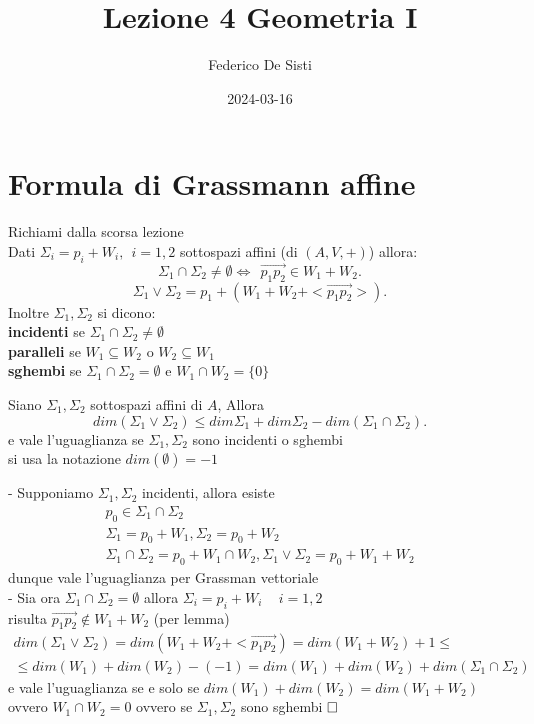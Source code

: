 \documentclass[12px]{article}
\title{Lezione 4 Geometria I}
\date{ 2024-03-16}
\author{Federico De Sisti}
\begin{document}
\newpage
\section{Formula di Grassmann affine}
Richiami dalla scorsa lezione\\
Dati $\Sigma_i = p_i + W_i, \ \ i=1,2$ sottospazi affini (di $(A,V,+)$) allora: \\
\[\Sigma_1\cap\Sigma_2\neq\emptyset \Leftrightarrow \ \ \overrightarrow{p_1p_2}\in W_1 + W_2.\]
\[
	\Sigma_1\vee\Sigma_2 = p_1 + (W_1 + W_2 + <\overrightarrow{p_1p_2}>)
.\] 
Inoltre $\Sigma_1, \Sigma_2$ si dicono:\\
\textbf{incidenti} se $\Sigma_1\cap\Sigma_2\neq\emptyset$\\
\textbf{paralleli} se $W_1\subseteq W_2$ o $W_2\subseteq W_1$ \\
\textbf{sghembi} se $\Sigma_1\cap\Sigma_2 = \emptyset$ e $W_1\cap W_2 = \{0\}$
\begin{prop}
	Siano $\Sigma_1, \Sigma_2 $ sottospazi affini di $A$, Allora 
	\[
	dim(\Sigma_1 \vee \Sigma_2) \leq dim\Sigma_1 + dim\Sigma_2 - dim(\Sigma_1\cap\Sigma_2)
	.\] 
	e vale l'uguaglianza se $\Sigma_1, \Sigma_2$ sono incidenti o sghembi\\
	si usa la notazione $dim(\emptyset) = -1$
\end{prop}
\begin{dimo}
	- Supponiamo $\Sigma_1,\Sigma_2$ incidenti, allora esiste
\begin{gather*}
	p_0 \in\Sigma_1\cap\Sigma_2 \\
	\Sigma_1 = p_0 + W_1, \Sigma_2 = p_0 + W_2\\
	\Sigma_1\cap\Sigma_2 = p_0 + W_1\cap W_2, \Sigma_1\vee\Sigma_2 = p_0 + W_1 + W_2
\end{gather*}
	dunque vale l'uguaglianza per Grassman vettoriale\\
	- Sia ora $\Sigma_1\cap\Sigma_2 = \emptyset$ allora $\Sigma_i = p_i + W_i$ ~ $i = 1, 2$\\
	risulta $\overrightarrow{p_1p_2}\notin W_1 + W_2$ (per lemma)\\
	\begin{gather*}
		dim(\Sigma_1\vee\Sigma_2) = dim(W_1 + W_2 + <\overrightarrow{p_1p_2}) = dim(W_1+W_2) + 1\leq \\ \leq dim(W_1) + dim(W_2) - (-1) = dim(W_1) + dim(W_2) + dim(\Sigma_1\cap\Sigma_2)
	\end{gather*}
	e vale l'uguaglianza se e solo se $dim(W_1) + dim(W_2) = dim(W_1 + W_2)$ ovvero $W_1\cap W_2 = {0}$ ovvero se $\Sigma_1, \Sigma_2$ sono sghembi $\hfill\square$	
\end{dimo}
\end{document}
